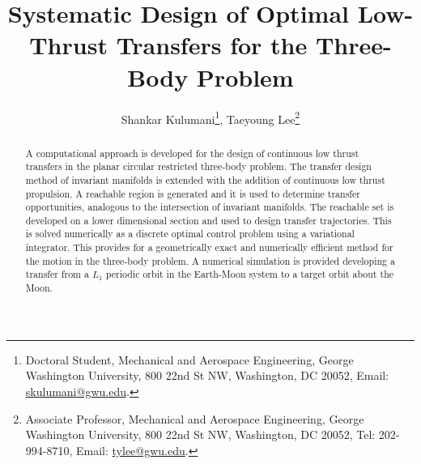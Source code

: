 \documentclass[letterpaper, paper,11pt]{AAS}		%
\begin{document}
\title{Systematic Design of Optimal Low-Thrust Transfers for the Three-Body Problem}

\author{Shankar Kulumani\thanks{Doctoral Student, Mechanical and Aerospace Engineering, George Washington University, 800 22nd St NW, Washington, DC 20052, Email: \href{mailto:skulumani@gwu.edu}{skulumani@gwu.edu}.},  
Taeyoung Lee\thanks{Associate Professor, Mechanical and Aerospace Engineering, George Washington University, 800 22nd St NW, Washington, DC 20052, Tel: 202-994-8710, Email: \href{mailto:tylee@gwu.edu}{tylee@gwu.edu}.}
}


\maketitle{} 		


\begin{abstract}
A computational approach is developed for the design of continuous low thrust transfers in the planar circular restricted three-body problem.
The transfer design method of invariant manifolds is extended with the addition of continuous low thrust propulsion.
A reachable region is generated and it is used to determine transfer opportunities, analogous to the intersection of invariant manifolds.
The reachable set is developed on a lower dimensional \Poincare section and used to design transfer trajectories. 
This is solved numerically as a discrete optimal control problem using a variational integrator.
This provides for a geometrically exact and numerically efficient method for the motion in the three-body problem.
A numerical simulation is provided developing a transfer from a \( L_1 \) periodic orbit in  the Earth-Moon system to a target orbit about the Moon.
\end{abstract}
\end{document}
